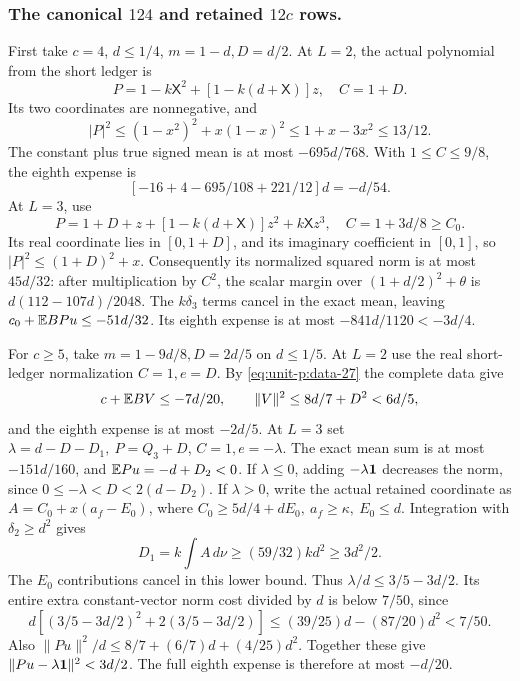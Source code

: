 \subsubsection{The canonical \(124\) and retained \(12c\) rows.}\label{part:unit-p:124-and-retained}
First take \(c=4\), \(d\le1/4\), \(m=1-d,D=d/2\).
At \(L=2\), the actual polynomial from the short ledger is
\[
 P=1-k\mathsf X^2+[1-k(d+\mathsf X)]z,\quad C=1+D .
\]
Its two coordinates are nonnegative, and
\[
 |P|^2\le(1-x^2)^2+x(1-x)^2
       \le1+x-3x^2\le13/12 .
\]
The constant plus true signed mean is at most
\(-695d/768\). With \(1\le C\le9/8\), the eighth expense is
\begin{equation}\label{eq:unit-p:data-33}
[-16+4-695/108+221/12]d=-d/54 .
\end{equation}
At \(L=3\), use
\[
 P=1+D+z+[1-k(d+\mathsf X)]z^2+k\mathsf Xz^3,
 \quad C=1+3d/8\ge C_0 .
\]
Its real coordinate lies in \([0,1+D]\), and its imaginary
coefficient in \([0,1]\), so \(|P|^2\le(1+D)^2+x\).
Consequently its normalized squared norm is at most \(45d/32\):
after multiplication by \(C^2\), the scalar margin over
\((1+d/2)^2+\theta\) is \(d(112-107d)/2048\).
The \(k\delta_3\) terms cancel in the exact mean, leaving
\(c_0+\mathbb E BPu\le-51d/32\).
Its eighth expense is at most \(-841d/1120<-3d/4\).

For \(c\ge5\), take \(m=1-9d/8,D=2d/5\) on \(d\le1/5\).
At \(L=2\) use the real short-ledger normalization \(C=1,e=D\).
By \eqref{eq:unit-p:data-27} the complete data give
\[
 c+\mathbb E BV\le-7d/20,\qquad
 \|V\|^2\le8d/7+D^2<6d/5 ,
\]
and the eighth expense is at most \(-2d/5\).
At \(L=3\) set \(\lambda=d-D-D_1,\ P=Q_3+D\),
\(C=1,e=-\lambda\). The exact mean sum is at most
\(-151d/160\), and \(\mathbb E Pu=-d+D_2<0\).
If \(\lambda\le0\), adding \(-\lambda\mathbf1\) decreases the norm,
since \(0\le-\lambda<D<2(d-D_2)\).
If \(\lambda>0\), write the actual retained coordinate as
\(A=C_0+x(a_f-E_0)\), where
\(C_0\ge5d/4+dE_0,\ a_f\ge\kappa,\ E_0\le d\).
Integration with \(\delta_2\ge d^2\) gives
\[
 D_1=k\int A\,d\nu\ge(59/32)kd^2\ge3d^2/2 .
\]
The \(E_0\) contributions cancel in this lower bound.
Thus \(\lambda/d\le3/5-3d/2\).
Its entire extra constant-vector norm cost divided by \(d\)
is below \(7/50\), since
\[
 d[(3/5-3d/2)^2+2(3/5-3d/2)]
 \le(39/25)d-(87/20)d^2<7/50 .
\]
Also \(\|Pu\|^2/d\le8/7+(6/7)d+(4/25)d^2\).
Together these give \(\|Pu-\lambda\mathbf1\|^2<3d/2\).
The full eighth expense is therefore at most \(-d/20\).

